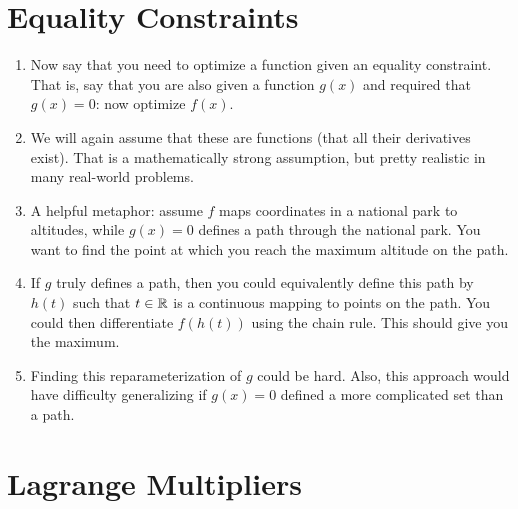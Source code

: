 \documentclass[11pt, oneside]{amsart}
\begin{document}
\section{Equality Constraints}

\begin{enumerate}
  \item Now say that you need to optimize a function given an equality
  constraint. That is, say that you are also given a function $g(x)$ and
  required that $g(x)=0$: now optimize $f(x)$.

  \item We will again assume that these are  functions
  (that all their derivatives exist). That is a mathematically strong
  assumption, but pretty realistic in many real-world problems.

  \item A helpful metaphor: assume $f$ maps coordinates in a national
  park to altitudes, while $g(x)=0$ defines a path through the national
  park. You want to find the point at which you reach the maximum
  altitude on the path.

  \item If $g$ truly defines a path, then you could equivalently define
  this path by $h(t)$ such that $t\in\mathbb{R}$ is a continuous mapping to
  points on the path. You could then differentiate $f(h(t))$ using the
  chain rule. This should give you the maximum.

  \item Finding this reparameterization of $g$ could be hard. Also, this
  approach would have difficulty generalizing if $g(x)=0$ defined a more
  complicated set than a path.
\end{enumerate}

\section{Lagrange Multipliers}
\end{document}
